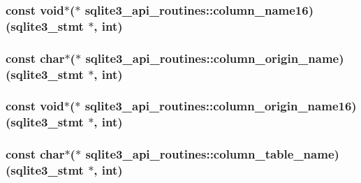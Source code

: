 \hypertarget{structsqlite3__api__routines_a1c7063d3e335648a8482fb1cdc46a627}{
\subsubsection[{column\-\_\-name16}]{\setlength{\rightskip}{0pt plus 5cm}const void$\ast$($\ast$ sqlite3\-\_\-api\-\_\-routines\-::column\-\_\-name16)({\bf sqlite3\-\_\-stmt} $\ast$, int)}}\label{structsqlite3__api__routines_a1c7063d3e335648a8482fb1cdc46a627}
\hypertarget{structsqlite3__api__routines_a6927f22bc705f4e518b1bc4a5d06a15d}{
\subsubsection[{column\-\_\-origin\-\_\-name}]{\setlength{\rightskip}{0pt plus 5cm}const char$\ast$($\ast$ sqlite3\-\_\-api\-\_\-routines\-::column\-\_\-origin\-\_\-name)({\bf sqlite3\-\_\-stmt} $\ast$, int)}}\label{structsqlite3__api__routines_a6927f22bc705f4e518b1bc4a5d06a15d}
\hypertarget{structsqlite3__api__routines_ac2ae192edc01c361562796e873f33134}{
\subsubsection[{column\-\_\-origin\-\_\-name16}]{\setlength{\rightskip}{0pt plus 5cm}const void$\ast$($\ast$ sqlite3\-\_\-api\-\_\-routines\-::column\-\_\-origin\-\_\-name16)({\bf sqlite3\-\_\-stmt} $\ast$, int)}}\label{structsqlite3__api__routines_ac2ae192edc01c361562796e873f33134}
\hypertarget{structsqlite3__api__routines_a1fc9721d32d8d99d26a97cae6882c34a}{
\subsubsection[{column\-\_\-table\-\_\-name}]{\setlength{\rightskip}{0pt plus 5cm}const char$\ast$($\ast$ sqlite3\-\_\-api\-\_\-routines\-::column\-\_\-table\-\_\-name)({\bf sqlite3\-\_\-stmt} $\ast$, int)}}\label{structsqlite3__api__routines_a1fc9721d32d8d99d26a97cae6882c34a}
